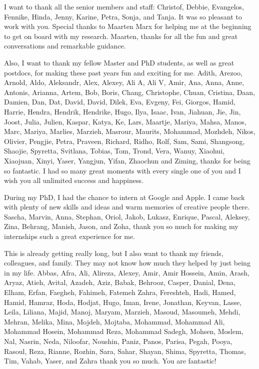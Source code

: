 I want to thank all the senior members and staff: Christof, Debbie, Evangelos, Fennike, Hinda, Jenny, Karine, Petra, Sonja, and Tanja. It was so pleasant to work with you.
Special thanks to Maarten Marx for helping me at the beginning to get on board with my research. Maarten, thanks for all the fun and great conversations and remarkable guidance.

Also, I want to thank my fellow Master and PhD students, as well as great postdocs, for making these past years fun and exciting for me. Adith, Arezoo, Arnold, Aldo, Aleksandr, Alex, Alexey, Ali A, Ali V, Amir, Ana, Anna, Anne, Antonis, Arianna, Artem, Bob, Boris, Chang, Christophe, Chuan, Cristina, Daan, Damien, Dan, Dat, David, David, Dilek, Eva, Evgeny, Fei, Giorgos, Hamid, Harrie, Hendra, Hendrik, Hendrike, Hugo, Ilya, Isaac, Ivan, Jiahuan, Jie, Jin, Joost, Julia, Julien, Kaspar, Katya, Ke, Lars, Maartje, Mariya, Mahsa, Manos, Marc, Mariya, Marlies, Marzieh, Masrour, Maurits, Mohammad, Mozhdeh, Nikos, Olivier, Pengjie, Petra, Praveen, Richard, Ridho, Rolf, Sam, Sami, Shangsong, Shaojie, Spyretta, Svitlana, Tobias, Tom, Trond, Vera, Wanuy, Xiaohui, Xiaojuan, Xinyi, Yaser, Yangjun, Yifan, Zhaochun and Ziming, thanks for being so fantastic.  I had so many great moments with every single one of you and I wish you all unlimited success and happiness.


During my PhD, I had the chance to intern at Google and Apple. I came back with plenty of new skills and ideas and warm memories of creative people there. Sascha, Marvin, Anna, Stephan, Oriol, Jakob, Lukasz, Enrique, Pascal, Aleksey, Zina, Behrang, Manish, Jason, and Zoha, thank you so much for making my internships such a great experience for me. 

This is already getting really long, but I also want to thank my friends, colleagues, and family. They may not know how much they helped by just being in my life. Abbas, Afra, Ali, Alireza, Alexey, Amir, Amir Hossein, Amin, Arash, Aryaz, Atieh, Avital, Azadeh, Aziz, Babak, Behrooz, Casper, Danial, Dena, Elham, Erfan, Faegheh, Fahimeh, Fatemeh Zahra, Fereshteh, Hadi, Hamed, Hamid, Hamraz, Hoda, Hodjat, Hugo, Iman, Irene, Jonathan, Keyvan, Lasse, Leila, Liliana, Majid, Manoj, Maryam, Marzieh, Masoud, Masoumeh, Mehdi, Mehran, Melika, Mina, Mojdeh, Mojtaba, Mohammad, Mohammad Ali, Mohammad Hosein, Mohammad Reza, Mohammad Sadegh, Mohsen, Moslem, Nal, Nasrin, Neda, Niloofar, Noushin, Paniz, Panos, Parisa, Pegah, Pooya, Rasoul, Reza, Rianne, Rozhin, Sara, Sahar, Shayan, Shima, Spyretta, Thomas, Tim, Vahab, Yaser, and Zahra thank you so much. You are fantastic!

